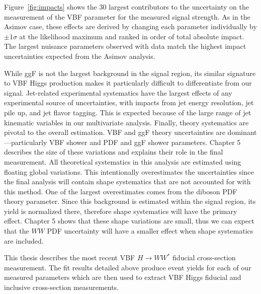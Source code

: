 Figure~\ref{fig:impacts} shows the 30 largest contributors to the uncertainty on the measurement of the VBF parameter for the measured signal strength. As in the Asimov case, these effects are derived by changing each parameter individually by $\pm 1\sigma$ at the likelihood maximum and ranked in order of total absolute impact. The largest nuisance parameters observed with data match the highest impact uncertainties expected from the Asimov analysis. 

While ggF is not the largest background in the signal region, its similar signature to VBF Higgs production makes it particularly difficult to differentiate from our signal. Jet-related experimental systematics have the largest effects of any experimental source of uncertainties, with impacts from jet energy resolution, jet pile up, and jet flavor tagging. This is expected because of the large range of jet kinematic variables in our multivariate analysis. Finally, theory systematics are pivotal to the overall estimation. VBF and ggF theory uncertainties are dominant---particularly VBF shower and PDF and ggF shower parameters. Chapter 5 describes the size of these variations and explains their role in the final measurement. All theoretical systematics in this analysis are estimated using floating global variations. This intentionally overestimates the uncertainties since the final analysis will contain shape systematics that are not accounted for with this method. One of the largest overestimates comes from the diboson PDF theory parameter. Since this background is estimated within the signal region, its yield is normalized there, therefore shape systematics will have the primary effect. Chapter 5 shows that these shape variations are small, thus we can expect that the $WW$ PDF uncertainty will have a smaller effect when shape systematics are included. 

This thesis describes the most recent VBF $H\rightarrow WW^*$ fiducial cross-section measurement. The fit results detailed above produce event yields for each of our measured parameters which are then used to extract VBF Higgs fiducial and inclusive cross-section measurements.

